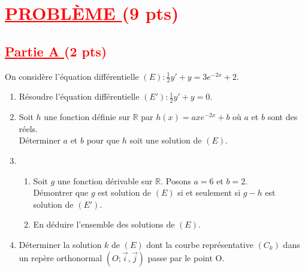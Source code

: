 \documentclass[12pt]{article}
\begin{document}
\section*{\textcolor{red}{\underline{PROBLÈME } (9 pts) }}
\subsection*{\textcolor{red}{\underline{Partie A }(2 pts)}}
On considère l'équation différentielle $(E):\frac{1}{2}y'+y=3e^{-2x}+2.$

\renewcommand{\labelenumi}{\theenumi)}
\begin{enumerate}[label=\arabic*)]
    \item Résoudre l'équation différentielle $(E'):\frac{1}{2}y'+y=0$.
    \item Soit $h$ une fonction définie sur $\mathbb{R}$ par $h(x)=axe^{-2x}+b$ où $a$ et $b$ sont  des réels.\\
        Déterminer $a$ et $b$ pour que $h$ soit une solution de $(E).$
    \item
    \begin{enumerate}[label=\alph*)]
        \item Soit $g$ une fonction dérivable sur $\mathbb{R}.$ Posons $a=6$ et $b=2.$\\
        Démontrer que $g$ est solution de $(E)$ si et seulement si $g-h$ est solution  de $(E').$
        \item En déduire l'ensemble des solutions de $(E)$.
    \end{enumerate}
    \item Déterminer la solution $k$ de $(E)$ dont la courbe représentative $(C_{k})$ dans un repère orthonormal $(O;\vec{i},\vec{j})$ passe par le point O.
\end{enumerate}
\end{document}
